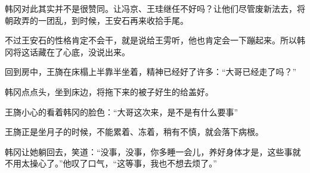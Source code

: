 韩冈对此其实并不是很赞同。让冯京、王珪继任不好吗？让他们尽管废新法去，将朝政弄的一团乱，到时候，王安石再来收拾手尾。

不过王安石的性格肯定不会干，就是说给王雱听，他也肯定会一下蹦起来。所以韩冈将这话藏在了心底，没说出来。

回到房中，王旖在床榻上半靠半坐着，精神已经好了许多：“大哥已经走了吗？”

韩冈点点头，坐到床边，将拖下来的被子好生的给盖好。

王旖小心的看着韩冈的脸色：“大哥这次来，是不是有什么要事”

王旖正是坐月子的时候，不能累着、冻着，稍有不慎，就会落下病根。

韩冈让她躺回去，笑道：“没事，没事，你多睡一会儿，养好身体才是，这些事就不用太操心了。”他叹了口气，“这等事，我也不想去烦了。”

